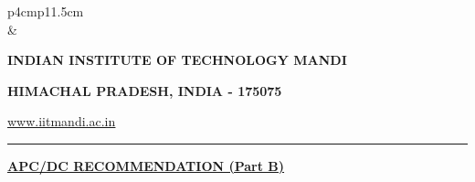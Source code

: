 \documentclass[12 pt, a4paper]{article}
\newcommand{\HRule}{\rule{\linewidth}{1mm}}
\begin{document}
\pagestyle{empty}
\vskip 0.2cm
	\begin{tabular}{p{4cm}p{11.5cm}}
		  \\
		& \centering \large\bf\phantom{Empty line}\\ 
		\rule{0pt}{1pt} \centering \large\bf{INDIAN INSTITUTE OF TECHNOLOGY MANDI} \\
		\rule{0pt}{1pt} \centering \large\bf{HIMACHAL PRADESH, INDIA - 175075} \\
		\rule{0pt}{1pt} \centering \underline{\href{www.iitmandi.ac.in}{www.iitmandi.ac.in}}\\
	\end{tabular}
\noindent

{\raggedleft{}\HRule}

\begin{center}
	\large\bf{\underline{APC/DC RECOMMENDATION (Part B)}} 
\end{center}
\end{document}
